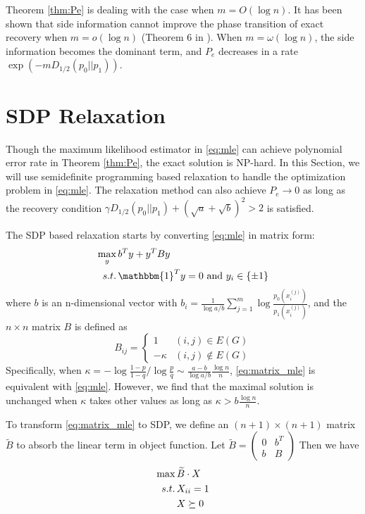\documentclass[conference]{IEEEtran}
\begin{document}
Theorem \ref{thm:Pe} is dealing with the case when $m=O(\log n)$. It has been shown
that side information cannot improve the phase transition of exact recovery when $m=o(\log n)$ (Theorem 6 in \cite{saad2018community}). When $m=\omega(\log n)$,
the side information becomes the dominant term, and $P_e$ decreases in a rate $\exp(-m D_{1/2}(p_0||p_1) )$.

\section{SDP Relaxation}
Though the maximum likelihood estimator in \eqref{eq:mle} can achieve polynomial
error rate in Theorem \ref{thm:Pe}, the exact solution is NP-hard. In this
Section, we will use semidefinite programming based relaxation to handle
the optimization problem in \eqref{eq:mle}. The relaxation method
can also achieve $P_e\to 0$ as long as the recovery condition
$\gamma D_{1/2}(p_0||p_1) + (\sqrt{a} + \sqrt{b})^2 > 2$ is satisfied.

The SDP based relaxation starts by converting \eqref{eq:mle} in matrix form:
\begin{align}
\max_{y}\, & b^T y + y^T B y \notag \\
s.t.\, & \mathbbm{1}^T y = 0 \text{ and } y_i \in \{\pm 1 \} \label{eq:matrix_mle}
\end{align}
where $b$ is an n-dimensional vector with $b_i = \frac{1}{\log a/b}\sum_{j=1}^m \log \frac{p_0(x_i^{(j)})}{p_1(x_i^{(j)})}$, and the $n\times n $ matrix $B$ is defined as
\begin{equation}
B_{ij} = \begin{cases}
1 & (i,j)\in E(G) \\
-\kappa & (i,j) \not\in E(G)
\end{cases}
\end{equation}
Specifically, when $\kappa = -\log\frac{1-p}{1-q} / \log\frac{p}{q} \sim \frac{a-b}{\log a/b}\frac{\log n}{n}$, \eqref{eq:matrix_mle} is equivalent with \eqref{eq:mle}. However, we find that
the maximal solution is unchanged when $\kappa$ takes other values as long as $\kappa > b\frac{\log n}{n}$.

To transform \eqref{eq:matrix_mle} to SDP, we define an $(n+1) \times (n+1)$ matrix $\widetilde{B}$
to absorb the linear term in object function.
Let $\tilde{B} = \begin{pmatrix} 0 & b^T \\ b & B \end{pmatrix}$
Then we have
\begin{align}
\max\, & \widetilde{B} \cdot X \notag \\
s.t.\,& X_{ii}=1 \notag \\
& X \succeq 0 \label{eq:sdp}
\end{align}
\end{document}
